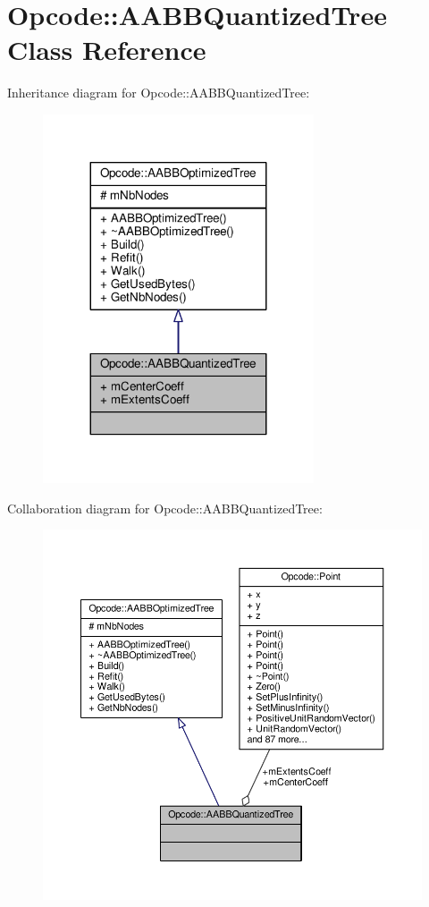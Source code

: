 \hypertarget{classOpcode_1_1AABBQuantizedTree}{}\section{Opcode\+:\+:A\+A\+B\+B\+Quantized\+Tree Class Reference}
\label{classOpcode_1_1AABBQuantizedTree}


Inheritance diagram for Opcode\+:\+:A\+A\+B\+B\+Quantized\+Tree\+:
\nopagebreak
\begin{figure}[H]
\begin{center}
\leavevmode
\includegraphics[width=227pt]{d1/d1f/classOpcode_1_1AABBQuantizedTree__inherit__graph}
\end{center}
\end{figure}


Collaboration diagram for Opcode\+:\+:A\+A\+B\+B\+Quantized\+Tree\+:
\nopagebreak
\begin{figure}[H]
\begin{center}
\leavevmode
\includegraphics[width=350pt]{de/d67/classOpcode_1_1AABBQuantizedTree__coll__graph}
\end{center}
\end{figure}
